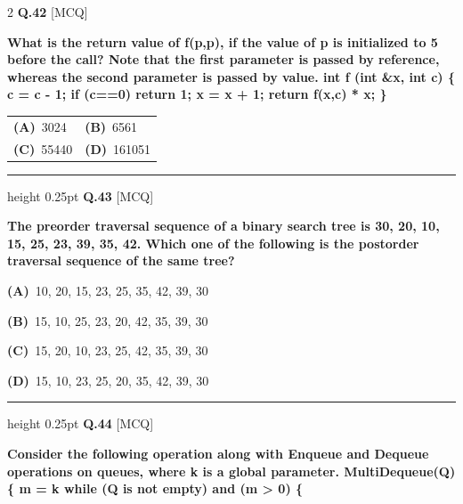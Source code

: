\documentclass[a4paper,10pt,twoside]{article}
\begin{document}
\begin{multicols}{2}
\noindent\textbf{Q.42} \hfill {\footnotesize\textsf{[MCQ]}}
\par\vspace{2pt}
{\bfseries What is the return value of f(p,p), if the value of p is initialized to 5 before the call? Note that
the first parameter is passed by reference, whereas the second parameter is passed by value.
int f (int \&x, int c) \{
c = c - 1;
if (c==0) return 1;
x = x + 1;
return f(x,c) * x;
\} \par}
\par\vspace{2pt}\noindent
\begin{tabular*}{\columnwidth}{@{\extracolsep{\fill}}p{}p{}@{}}
\textbf{(A)}~3024 & \textbf{(B)}~6561 \\
\addlinespace[2pt]
\textbf{(C)}~55440 & \textbf{(D)}~161051
\end{tabular*}
\par\vspace{6pt}\hrule height 0.25pt\vspace{6pt}
\noindent\textbf{Q.43} \hfill {\footnotesize\textsf{[MCQ]}}
\par\vspace{2pt}
{\bfseries The preorder traversal sequence of a binary search tree is 30, 20, 10, 15, 25, 23, 39, 35, 42. Which
one of the following is the postorder traversal sequence of the same tree? \par}
\par\vspace{2pt}\noindent
\textbf{(A)}~10, 20, 15, 23, 25, 35, 42, 39, 30\par\vspace{2pt}\noindent
\textbf{(B)}~15, 10, 25, 23, 20, 42, 35, 39, 30\par\vspace{2pt}\noindent
\textbf{(C)}~15, 20, 10, 23, 25, 42, 35, 39, 30\par\vspace{2pt}\noindent
\textbf{(D)}~15, 10, 23, 25, 20, 35, 42, 39, 30
\par\vspace{6pt}\hrule height 0.25pt\vspace{6pt}
\noindent\textbf{Q.44} \hfill {\footnotesize\textsf{[MCQ]}}
\par\vspace{2pt}
{\bfseries Consider the following operation along with Enqueue and Dequeue operations on queues, where
k is a global parameter.
MultiDequeue(Q)\{
m = k
while (Q is not empty) and (m > 0) \{
}
\end{multicols}
\end{document}
